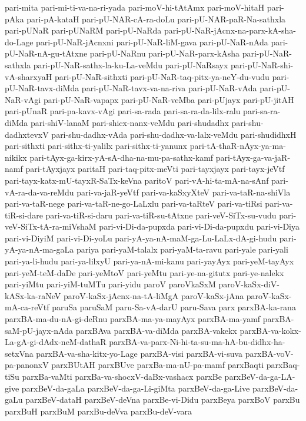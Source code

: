 {pari-mita
pari-mi-ti-va-na-ri-yada
pari-moV-hi-tAtAmx
pari-moV-hitaH
pari-pAka
pari-pA-kataH
pari-pU-NAR-cA-ra-doLu
pari-pU-NAR-paR-Na-sathxla
pari-pUNaR
pari-pUNaRM
pari-pU-NaRda
pari-pU-NaR-jAcnx-na-parx-kA-sha-do-Lage
pari-pU-NaR-jAcnxni
pari-pU-NaR-liM-gava
pari-pU-NaR-nAda
pari-pU-NaR-nA-gu-tAtxne
pari-pU-NaRnu
pari-pU-NaR-parx-kAsha
pari-pU-NaR-sathxla
pari-pU-NaR-sathx-la-ku-La-veMdu
pari-pU-NaRsayx
pari-pU-NaR-shi-vA-sharxyaH
pari-pU-NaR-sithxti
pari-pU-NaR-taq-pitx-ya-neY-du-vudu
pari-pU-NaR-tavx-diMda
pari-pU-NaR-tavx-va-na-riva
pari-pU-NaR-vAda
pari-pU-NaR-vAgi
pari-pU-NaR-vapapx
pari-pU-NaR-veMba
pari-pUjayx
pari-pU-jitAH
pari-pUnaR
pari-pa-kavx-vAgi
pari-sa-rada
pari-sa-ra-da-lilx-ralu
pari-sa-ra-diMda
pari-shiV-lanaM
pari-shicx-nanx-veMdu
pari-shudadhx
pari-shu-dadhxtevxV
pari-shu-dadhx-vAda
pari-shu-dadhx-va-lalx-veMdu
pari-shudidhxH
pari-sithxti
pari-sithx-ti-yalilx
pari-sithx-ti-yanunx
pari-tA-thaR-nAyx-ya-ma-nikikx
pari-tAyx-ga-kirx-yA-sA-dha-na-mu-pa-sathx-kamf
pari-tAyx-ga-va-jaR-namf
pari-tAyxjayx
paritaH
pari-taq-pitx-meVti
pari-tayxjayx
pari-tayx-jeVtf
pari-tayx-katx-mU-tayxR-SaTx-keVna
paritoV
pari-vA-hi-ta-mA-na-sAnf
pari-vA-ra-da-va-reMdu
pari-va-jaR-yeVtf
pari-va-kaSxyXteV
pari-va-taR-na-shiVla
pari-va-taR-nege
pari-va-taR-ne-go-LaLxlu
pari-va-taRteV
pari-va-tiRsi
pari-va-tiR-si-dare
pari-va-tiR-si-daru
pari-va-tiR-su-tAtxne
pari-veV-SiTx-su-vudu
pari-veV-SiTx-tA-ra-miVshaM
pari-vi-Di-da-pupxda
pari-vi-Di-da-pupxdu
pari-vi-Diya
pari-vi-DiyiM
pari-vi-Di-yoLu
pari-yA-ya-nA-maM-ga-Lu-LaLx-dA-gi-hudu
pari-yA-ya-nA-ma-gaLa
pariya
pari-yaM-talalx
pari-yaM-ta-ravu
pari-yale
pari-yali
pari-ya-li-hudu
pari-ya-lilxyU
pari-ya-nA-mi-kanu
pari-yayAyx
pari-yeM-tayAyx
pari-yeM-teM-daDe
pari-yeMtoV
pari-yeMtu
pari-ye-na-gitutx
pari-ye-nalekx
pari-yiMtu
pari-yiM-tuMTu
pari-yidu
paroV
paroVkaSxM
paroV-kaSx-diV-kASx-ka-raNeV
paroV-kaSx-jAcnx-na-tA-liMgA
paroV-kaSx-jAna
paroV-kaSx-mA-ca-reVtf
paruSa
paruSaM
paru-Sa-vA-darU
paru-Sava
parx
parxBA-ka-rana
parxBA-ma-du-nA-gi-deRnu
parxBA-ma-ya-mayAyx
parxBA-ma-yamf
parxBA-saM-pU-jayx-nAda
parxBAva
parxBA-va-diMda
parxBA-vakekx
parxBA-va-kokx-La-gA-gi-dAdx-neM-dathaR
parxBA-va-parx-Ni-hi-ta-su-ma-hA-bu-didhx-ha-setxVna
parxBA-va-sha-kitx-yo-Lage
parxBA-visi
parxBA-vi-suva
parxBA-voV-pa-panonxV
parxBUtAH
parxBUve
parxBa-ma-nU-pa-mamf
parxBaqti
parxBaq-tiSu
parxBa-vaMti
parxBa-va-shocxV-daBx-vashacx
parxBe
parxBeV-da-ga-LA-give
parxBeV-da-gaLa
parxBeV-da-ga-Li-giMta
parxBeV-da-ga-Live
parxBeV-da-gaLu
parxBeV-dataH
parxBeV-deVna
parxBe-vi-Didu
parxBeya
parxBoV
parxBu
parxBuH
parxBuM
parxBu-deVva
parxBu-deV-vara
}
